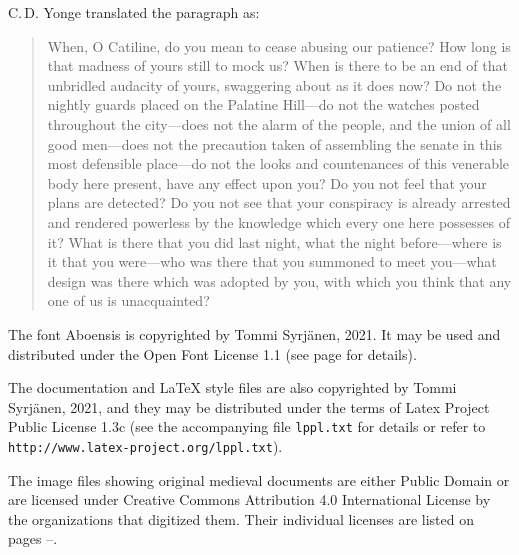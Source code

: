 \documentclass[a4paper]{article}
\begin{document}
C.\,D. Yonge \cite{yonge} translated the paragraph as:

 \begin{quote}
   When, O Catiline, do you mean to cease abusing our patience? How
   long is that madness of yours still to mock us? When is there to be
   an end of that unbridled audacity of yours, swaggering about as it
   does now? Do not the nightly guards placed on the Palatine Hill—do
   not the watches posted throughout the city—does not the alarm of the
   people, and the union of all good men—does not the precaution taken
   of assembling the senate in this most defensible place—do not the
   looks and countenances of this venerable body here present, have any
   effect upon you? Do you not feel that your plans are detected? Do
   you not see that your conspiracy is already arrested and rendered
   powerless by the knowledge which every one here possesses of it?
   What is there that you did last night, what the night before—where
   is it that you were—who was there that you summoned to meet
   you—what design was there which was adopted by you, with which you
   think that any one of us is unacquainted?
 \end{quote}


\vfill


The font Aboensis is copyrighted by Tommi Syrjänen, 2021. It may be
used and distributed under the Open Font License 1.1 (see
page \pageref{pg_license} for details).

The documentation and LaTeX style files are also copyrighted by Tommi
Syrjänen, 2021, and they may be distributed under the terms of Latex
Project Public License 1.3c (see the accompanying file
\texttt{lppl.txt} for details or refer to
\texttt{http://www.latex-project.org/lppl.txt}).

The image files showing original medieval documents are either Public
Domain or are licensed under Creative Commons Attribution 4.0
International License by the organizations that digitized them. Their
individual licenses are listed on pages
\pageref{image_license_start}–\pageref{image_license_end}.


\newpage

\nocite{aboensis_77}
\nocite{rea1996}
\nocite{df}
\nocite{sdhk}
\nocite{cf}
\nocite{coda}
\nocite{codc}
\nocite{suvanto1995}
\nocite{keranen2018}
\nocite{seppala09}
\nocite{vilkuna98}
\nocite{derolez03}
\nocite{valtionarkisto77}
\nocite{makela_alitalo07}
\nocite{jansson98}
\nocite{oxenstierna04}
\nocite{wiktorsson04}
\nocite{svensson74}
\nocite{jansson36}
\nocite{thulin36}
\nocite{voionmaa36}
\nocite{melander1892}
\nocite{voudintilit}
\nocite{dokumentteja1}
\end{document}
